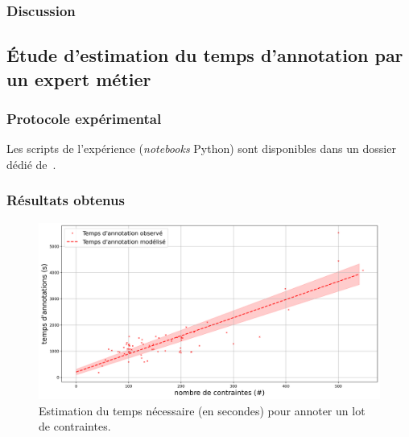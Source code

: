 		\subsubsection{Discussion}
		
	
	\subsection{Étude d'estimation du temps d'annotation par un expert métier}
	\label{section:4.3.2-ETUDE-COUTS-TEMPS-ANNOTATION}
	
		\subsubsection{Protocole expérimental}
		

			\begin{leftBarInformation}
				Les scripts de l'expérience (\textit{notebooks} Python) sont disponibles dans un dossier dédié de~\cite{schild:cognitivefactory-interactive-clustering-comparative-study:2021}.
			\end{leftBarInformation}

		\subsubsection{Résultats obtenus}
		
			\begin{figure}[!htb]
				\centering
				\includegraphics[width=\textwidth]{figures/etude-temps-annotation-1-modelisation-temps}
				\caption{Estimation du temps nécessaire (en secondes) pour annoter un lot de contraintes.}
				\label{figure:4.3.2-ETUDE-COUTS-TEMPS-ANNOTATION-SIMULATION}
			\end{figure}
			
